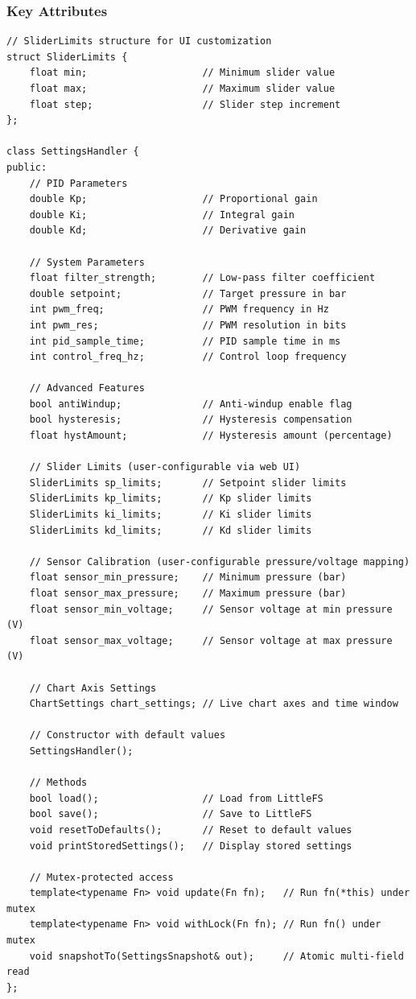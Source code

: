 \subsubsection{Key Attributes}
\begin{lstlisting}[caption=SettingsHandler Class Key Members - Actual Implementation]
// SliderLimits structure for UI customization
struct SliderLimits {
    float min;                    // Minimum slider value
    float max;                    // Maximum slider value
    float step;                   // Slider step increment
};

class SettingsHandler {
public:
    // PID Parameters
    double Kp;                    // Proportional gain
    double Ki;                    // Integral gain  
    double Kd;                    // Derivative gain
    
    // System Parameters
    float filter_strength;        // Low-pass filter coefficient
    double setpoint;              // Target pressure in bar
    int pwm_freq;                 // PWM frequency in Hz
    int pwm_res;                  // PWM resolution in bits
    int pid_sample_time;          // PID sample time in ms
    int control_freq_hz;          // Control loop frequency
    
    // Advanced Features
    bool antiWindup;              // Anti-windup enable flag
    bool hysteresis;              // Hysteresis compensation
    float hystAmount;             // Hysteresis amount (percentage)
    
    // Slider Limits (user-configurable via web UI)
    SliderLimits sp_limits;       // Setpoint slider limits
    SliderLimits kp_limits;       // Kp slider limits
    SliderLimits ki_limits;       // Ki slider limits
    SliderLimits kd_limits;       // Kd slider limits
    
    // Sensor Calibration (user-configurable pressure/voltage mapping)
    float sensor_min_pressure;    // Minimum pressure (bar)
    float sensor_max_pressure;    // Maximum pressure (bar)
    float sensor_min_voltage;     // Sensor voltage at min pressure (V)
    float sensor_max_voltage;     // Sensor voltage at max pressure (V)
    
    // Chart Axis Settings
    ChartSettings chart_settings; // Live chart axes and time window
    
    // Constructor with default values
    SettingsHandler();
    
    // Methods
    bool load();                  // Load from LittleFS
    bool save();                  // Save to LittleFS
    void resetToDefaults();       // Reset to default values
    void printStoredSettings();   // Display stored settings
    
    // Mutex-protected access
    template<typename Fn> void update(Fn fn);   // Run fn(*this) under mutex
    template<typename Fn> void withLock(Fn fn); // Run fn() under mutex
    void snapshotTo(SettingsSnapshot& out);     // Atomic multi-field read
};
\end{lstlisting}

